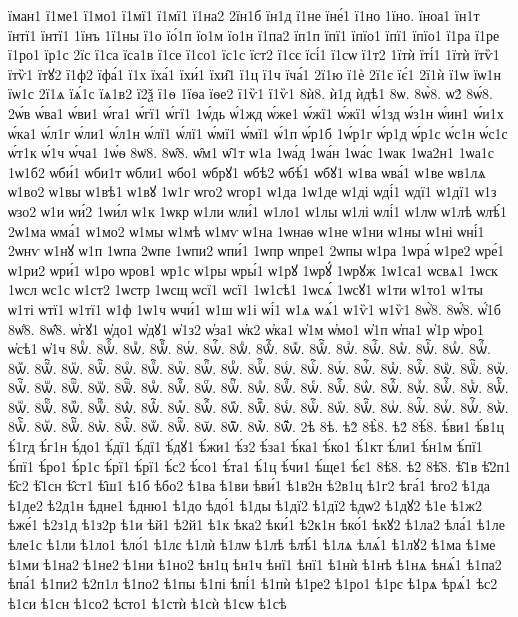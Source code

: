 {їман1
ї1ме1
ї1мо1
ї1мї1
ї1мї1
ї1на2
2їн1б
їн1д
ї1не
їне́1
ї1но
1їно.
їноа1
їн1т
їнтї1
їнтї1
1їнъ
1ї1ны
ї1о
їо́1п
їо1м
їо1н
ї1па2
їп1п
їпї1
їпїо1
їпї1
їпїо1
ї1ра
ї1ре
ї1ро1
їр1с
2їс
ї1са
їса1в
ї1се
ї1со1
їс1с
їст2
ї1сє
їсі́1
ї1сѡ
ї1т2
1їтѝ
їті́1
1їтѝ
їтѷ1
їтѷ1
їтꙋ2
ї1ф2
їфа́1
ї1х
їха́1
їхи́1
їхи̑1
ї1ц
ї1ч
їча́1
2ї1ю
ї1ѐ
2ї1є
їє́1
2ї1ѝ
ї1ѡ
їѡ1н
їѡ1с
2ї1ѧ
їѧ́1с
їѧ1в2
ї2ѯ
ї1ѳ
1їѳа
їѳе2
ї1ѷ1
ї1ѷ1
8ѝ8.
ѝ1д
ѝдѣ1
8ѡ.
8ѡ̀8.
ѡ2́
8ѡ́8.
2ѡ́в
ѡ́ва1
ѡ́ви1
ѡ́га1
ѡ́гї1
ѡ́гї1
1ѡ́дь
ѡ́1жд
ѡ́же1
ѡ́жї1
ѡ́жї1
ѡ́1зд
ѡ́з1н
ѡ́ин1
ѡ́и1х
ѡ́ка1
ѡ́л1г
ѡ́ли1
ѡ́л1н
ѡ́лї1
ѡ́лї1
ѡ́мї1
ѡ́мї1
ѡ́1п
ѡ́р1б
1ѡ́р1г
ѡ́р1д
ѡ́р1с
ѡ́с1н
ѡ́с1с
ѡ́т1к
ѡ́1ч
ѡ́ча1
1ѡ́ѳ
8ѡ̈8.
8ѡ̑8.
ѡ̑м1
ѡ̑1т
ѡ1а
1ѡа́д
1ѡа́н
1ѡа́с
1ѡак
1ѡа2н1
1ѡа1с
1ѡ1б2
ѡби́1
ѡби1т
ѡбли1
ѡбо1
ѡбрꙋ1
ѡбѣ2
ѡбѣ́1
ѡбꙋ1
ѡ1ва
ѡва́1
ѡ1ве
ѡв1лѧ
ѡ1во2
ѡ1вы
ѡ1вѣ1
ѡ1вꙋ
1ѡ1г
ѡго2
ѡгор1
ѡ1да
1ѡ1де
ѡ1ді
ѡді́1
ѡдї1
ѡ1дї1
ѡ1з
ѡзо2
ѡ1и
ѡи́2
1ѡи́л
ѡ1к
1ѡкр
ѡ1ли
ѡли́1
ѡ1ло1
ѡ1лы
ѡ1лі
ѡлі́1
ѡ1лѡ
ѡ1лѣ
ѡлѣ́1
2ѡ1ма
ѡма́1
ѡ1мо2
ѡ1мы
ѡ1мѣ
ѡ1мѵ
ѡ1на
1ѡнаѳ
ѡ1не
ѡ1ни
ѡ1ны
ѡ1ні
ѡні́1
2ѡнѵ
ѡ1нꙋ
ѡ1п
1ѡпа
2ѡпе
1ѡпи2
ѡпи́1
1ѡпр
ѡпре1
2ѡпы
ѡ1ра
1ѡра́
ѡ1ре2
ѡре́1
ѡ1ри2
ѡри́1
ѡ1ро
ѡров1
ѡр1с
ѡ1ры
ѡры́1
ѡ1рꙋ
1ѡрꙋ́
1ѡрꙋж
1ѡ1са1
ѡсвѧ1
1ѡск
1ѡсл
ѡс1с
ѡ1ст2
1ѡстр
1ѡсщ
ѡсї1
ѡсї1
1ѡ1сѣ1
1ѡсѧ́
1ѡсꙋ1
ѡ1ти
ѡ1то1
ѡ1ты
ѡ1ті
ѡтї1
ѡ1тї1
ѡ1ф
1ѡ1ч
ѡчи́1
ѡ1ш
ѡ1і
ѡі́1
ѡ1ѧ
ѡѧ́1
ѡ1ѷ1
ѡ1ѷ1
8ѡ҆̀8.
8ѡ҆́8.
ѡ҆́1б
8ѡ҆̈8.
8ѡ҆̑8.
ѡ҆гꙋ1
ѡ҆до1
ѡ҆дꙋ1
ѡ҆1з2
ѡ҆за1
ѡ҆к2
ѡ҆ка1
ѡ҆1м
ѡ҆мо1
ѡ҆1п
ѡ҆па1
ѡ҆1р
ѡ҆ро1
ѡ҆сѣ1
ѡ҆1ч
8ѡⷠ.
8ѡⷠ҇.
8ѡⷡ.
8ѡⷡ҇.
8ѡⷢ.
8ѡⷢ҇.
8ѡⷣ.
8ѡⷣ҇.
8ѡⷤ.
8ѡⷤ҇.
8ѡⷥ.
8ѡⷥ҇.
8ѡⷦ.
8ѡⷦ҇.
8ѡⷧ.
8ѡⷧ҇.
8ѡⷨ.
8ѡⷨ҇.
8ѡⷩ.
8ѡⷩ҇.
8ѡⷪ.
8ѡⷪ҇.
8ѡⷫ.
8ѡⷫ҇.
8ѡⷬ.
8ѡⷬ҇.
8ѡⷭ.
8ѡⷭ҇.
8ѡⷮ.
8ѡⷮ҇.
8ѡⷯ.
8ѡⷯ҇.
8ѡⷰ.
8ѡⷰ҇.
8ѡⷱ.
8ѡⷱ҇.
8ѡⷲ.
8ѡⷲ҇.
8ѡⷳ.
8ѡⷳ҇.
8ѡⷴ.
8ѡⷴ҇.
8ѡⷵ.
8ѡⷵ҇.
8ѡⷶ.
8ѡⷶ҇.
8ѡⷷ.
8ѡⷷ҇.
8ѡⷸ.
8ѡⷸ҇.
8ѡⷹ.
8ѡⷹ҇.
8ѡⷺ.
8ѡⷺ҇.
8ѡⷻ.
8ѡⷻ҇.
8ѡⷼ.
8ѡⷼ҇.
8ѡⷽ.
8ѡⷽ҇.
8ѡⷾ.
8ѡⷾ҇.
8ѡⷿ.
8ѡⷿ҇.
8ѡꙴ.
8ѡꙴ҇.
8ѡꙵ.
8ѡꙵ҇.
8ѡꙶ.
8ѡꙶ҇.
8ѡꙷ.
8ѡꙷ҇.
8ѡꙸ.
8ѡꙸ҇.
8ѡꙹ.
8ѡꙹ҇.
8ѡꙺ.
8ѡꙺ҇.
8ѡꙻ.
8ѡꙻ҇.
8ѡ꙼.
8ѡ꙼҇.
8ѡ꙽.
8ѡ꙽҇.
2ѣ
8ѣ.
ѣ2̀
8ѣ̀8.
ѣ2́
8ѣ́8.
ѣ́ви1
ѣ́в1ц
ѣ́1гд
ѣ́г1н
ѣ́до1
ѣ́дї1
ѣ́дї1
ѣ́дꙋ1
ѣ́жи1
ѣ́з2
ѣ́за1
ѣ́ка1
ѣ́ко1
ѣ́1кт
ѣ́ли1
ѣ́н1м
ѣ́пї1
ѣ́пї1
ѣ́ро1
ѣ́р1с
ѣ́рї1
ѣ́рї1
ѣ́с2
ѣ́со1
ѣ́та1
ѣ́1ц
ѣ́чи1
ѣ́ще1
ѣ́є1
8ѣ̈8.
ѣ2̑
8ѣ̑8.
ѣ̑1в
ѣ̑2п1
ѣ̑с2
ѣ̑1сн
ѣ̑ст1
ѣ̑ш1
ѣ1б
ѣбо2
ѣ1ва
ѣ1ви
ѣви́1
ѣ1в2н
ѣ2в1ц
ѣ1г2
ѣга́1
ѣго2
ѣ1да
ѣ1де2
ѣ2д1н
ѣдне1
ѣдню1
ѣ1до
ѣдо́1
ѣ1ды
ѣ1дї2
ѣ1дї2
ѣдѡ2
ѣ1дꙋ2
ѣ1е
ѣ1ж2
ѣже́1
ѣ2з1д
ѣ1з2р
ѣ1и
ѣй1
ѣ2й1
ѣ1к
ѣка2
ѣки́1
ѣ2к1н
ѣко́1
ѣкꙋ2
ѣ1ла2
ѣла́1
ѣ1ле
ѣле1с
ѣ1ли
ѣ1ло1
ѣло́1
ѣ1лє
ѣ1лѝ
ѣ1лѡ
ѣ1лѣ
ѣлѣ́1
ѣ1лѧ
ѣлѧ́1
ѣ1лꙋ2
ѣ1ма
ѣ1ме
ѣ1ми
ѣ1на2
ѣ1не2
ѣ1ни
ѣ1но2
ѣн1ц
ѣн1ч
ѣнї1
ѣнї1
ѣ1нѝ
ѣ1нѣ
ѣ1нѧ
ѣнѧ́1
ѣ1па2
ѣпа́1
ѣ1пи2
ѣ2п1л
ѣ1по2
ѣ1пы
ѣ1пі
ѣпі́1
ѣ1пѝ
ѣ1ре2
ѣ1ро1
ѣ1рє
ѣ1рѧ
ѣрѧ́1
ѣс2
ѣ1си
ѣ1сн
ѣ1со2
ѣсто1
ѣ1стѝ
ѣ1сѝ
ѣ1сѡ
ѣ1сѣ
}
